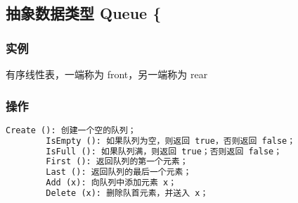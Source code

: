 \documentclass[UTF8]{ctexart}
\begin{document}
	\subsection*{抽象数据类型 Queue \{}
	
	\subsubsection*{实例}
	有序线性表，一端称为 front，另一端称为 rear
	
	\subsubsection*{操作}
	\begin{lstlisting}[language=Python, caption={Queue ADT}]
		Create (): 创建一个空的队列；
		IsEmpty (): 如果队列为空，则返回 true，否则返回 false；
		IsFull (): 如果队列满，则返回 true；否则返回 false；
		First (): 返回队列的第一个元素；
		Last (): 返回队列的最后一个元素；
		Add (x): 向队列中添加元素 x；
		Delete (x): 删除队首元素，并送入 x；
	\end{lstlisting}
	
\end{document}
